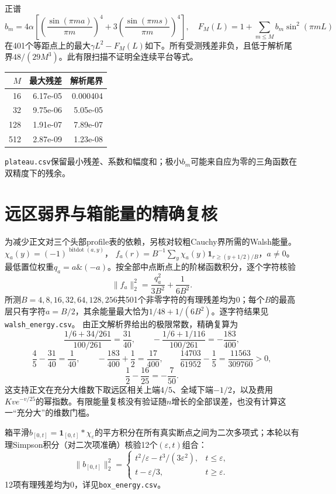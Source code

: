 \documentclass[UTF8,a4paper,11pt,fontset=none]{ctexart}
\begin{document}
正谱
\[
b_m=4\alpha\left[\left(\frac{\sin(\pi ma)}{\pi m}\right)^4
+3\left(\frac{\sin(\pi ms)}{\pi m}\right)^4\right],\quad
F_M(L)=1+\sum_{m\le M}b_m\sin^2(\pi mL)
\]
在401个等距点上的最大\(\gamma L^2-F_M(L)\)如下。所有受测残差非负，且低于解析尾界\(48/(29M^3)\)。此有限扫描不证明全连续平台等式。
\begin{center}\begin{tabular}{rrr}\toprule
\(M\)&最大残差&解析尾界\\\midrule
16 & 6.17e-05 & 0.000404\\
32 & 9.75e-06 & 5.05e-05\\
128 & 1.91e-07 & 7.89e-07\\
512 & 2.87e-09 & 1.23e-08\\
\bottomrule\end{tabular}\end{center}
\nolinkurl{plateau.csv}保留最小残差、系数和幅度和；极小\(b_m\)可能来自应为零的三角函数在双精度下的残余。

\section{远区弱界与箱能量的精确复核}
为减少正文对三个头部profile表的依赖，另核对较粗Cauchy界所需的Walsh能量。
\(\chi_a(y)=(-1)^{\operatorname{bitdot}(a,y)}\)，
\(f_a(r)=B^{-1}\sum_y\chi_a(y)\mathbf1_{r\ge(y+1/2)/B}\)，\(a\ne0\)。
最低置位权重\(q_a=a\mathbin{\&}(-a)\)。按全部中点断点上的阶梯函数积分，逐个字符核验
\[
\|f_a\|_2^2=\frac{q_a^2}{3B^2}+\frac1{6B^2}.
\]
所测\(B=4,8,16,32,64,128,256\)共501个非零字符的有理残差均为0；每个\(B\)的最高层只有字符\(a=B/2\)，其余能量最大恰为\(1/48+1/(6B^2)\)。逐字符结果见\nolinkurl{walsh_energy.csv}。
由正文解析界给出的极限常数，精确复算为
\[
\frac{1/6+34/261}{100/261}=\frac{31}{40},\qquad
-\frac{1/6+1/116}{100/261}=-\frac{183}{400},
\]
\[
\frac45-\frac{31}{40}=\frac1{40},\qquad
-\frac{183}{400}+\frac12=\frac{17}{400},\qquad
\frac{14703}{61952}-\frac15=\frac{11563}{309760}>0,
\]
\[
\frac12-\frac{16}{25}=-\frac7{50}.
\]
这支持正文在充分大维数下取远区相关上端\(4/5\)、全域下端\(-1/2\)，以及费用\(Kv e^{-v/25}\)的幂指数。有限能量复核没有验证随\(n\)增长的全部误差，也没有计算这一``充分大''的维数门槛。

箱平滑\(b_{[0,t]}=\mathbf1_{[0,t]}*\chi_\varepsilon\)的平方积分在所有真实断点之间为二次多项式；本轮以有理Simpson积分（对二次项准确）核验12个\((\varepsilon,t)\)组合：
\[
\|b_{[0,t]}\|_2^2=
\begin{cases}t^2/\varepsilon-t^3/(3\varepsilon^2),&t\le\varepsilon,\\
t-\varepsilon/3,&t\ge\varepsilon.
\end{cases}
\]
12项有理残差均为0，详见\nolinkurl{box_energy.csv}。
\end{document}
